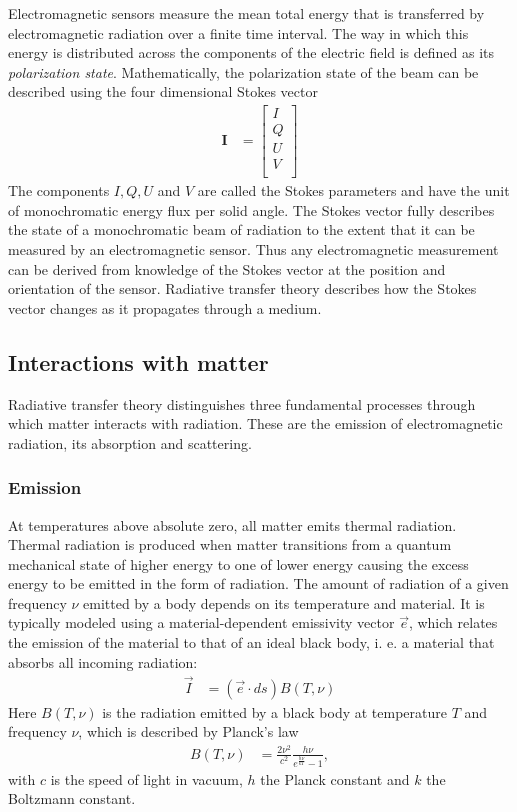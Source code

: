 Electromagnetic sensors measure the mean total energy that is transferred by
electromagnetic radiation over a finite time interval. The way in which this
energy is distributed across the components of the electric field is defined as
its \textit{polarization state}. Mathematically, the polarization state of the
beam can be described using the four dimensional Stokes vector
\begin{align}
  \bm{I} &= \left [ \begin{array}{c}
    I \\
    Q \\
    U \\
    V \\
    \end{array} \right ]
\end{align}
The components $I, Q, U$ and $V$ are called the Stokes parameters and have the
unit of monochromatic energy flux per solid angle. The Stokes vector fully
describes the state of a monochromatic beam of radiation to the extent that it
can be measured by an electromagnetic sensor. Thus any electromagnetic
measurement can be derived from knowledge of the Stokes vector at the position
and orientation of the sensor. Radiative transfer theory describes how the
Stokes vector changes as it propagates through a medium.

\subsection{Interactions with matter}

Radiative transfer theory distinguishes three fundamental processes through
which matter interacts with radiation. These are the emission of
electromagnetic radiation, its absorption and scattering.

\subsubsection{Emission}

At temperatures above absolute zero, all matter emits thermal radiation. Thermal
radiation is produced when matter transitions from a quantum mechanical state
of higher energy to one of lower energy causing the excess energy to be emitted
in the form of radiation. The amount of radiation of a given frequency $\nu$
emitted by a body depends on its temperature and material. It is typically
modeled using a material-dependent emissivity vector $\vec{e}$, which relates
the emission of the material to that of an ideal black body, i. e. a material
that absorbs all incoming radiation:
 \begin{align}
   \label{eq:emissivity}
   \vec{I} &= (\vec{e} \cdot ds) B(T, \nu)
 \end{align}
 Here $B(T, \nu)$ is the radiation emitted by a black body at temperature $T$
 and frequency $\nu$, which is described by Planck's law
 \begin{align}
   B(T, \nu) &= \frac{2 \nu^2}{c^2}\frac{h\nu}{e^{\frac{h\nu}{k T}} - 1},
 \end{align}
 with $c$ is the speed of light in vacuum, $h$  the Planck constant and $k$
 the Boltzmann constant.

